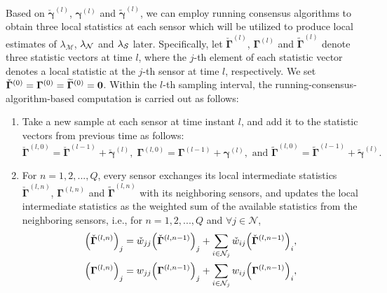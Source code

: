 \documentclass[11pt, draftclsnofoot, onecolumn]{IEEEtran}
\newcommand{\cM}{\mathcal{M}}
\newcommand{\cN}{\mathcal{N}}
\newcommand{\bgamma}{{\boldsymbol{\gamma}}}
\newcommand{\cbgamma}{{\check{\boldsymbol{\gamma}}}}
\newcommand{\tbgamma}{{\widetilde{\boldsymbol{\gamma}}}}
\newcommand{\bGamma}{{\boldsymbol{\Gamma}}}
\newcommand{\cbGamma}{{\check{\boldsymbol{\Gamma}}}}
\newcommand{\tbGamma}{{\widetilde{\boldsymbol{\Gamma}}}}
\newcommand{\cw}{{\check{w}}}
\begin{document}
Based on $\cbgamma^{(l)}$, $\bgamma^{(l)}$ and $\tbgamma^{(l)}$,  we can employ running consensus algorithms to obtain   three   local statistics at each sensor which will be utilized to produce local estimates of ${\lambda _\cM}$, ${\lambda _{\cal N}} $ and ${\lambda _{\cal S}}$ later. Specifically, let ${\cbGamma ^{\left( l \right)}}$, ${\bGamma ^{\left( l \right)}}$ and ${\tbGamma ^{\left( l \right)}}$ denote three statistic vectors at time $l$, where the $j$-th element of each statistic vector denotes a local statistic at the $j$-th sensor at time $l$, respectively. We set ${\cbGamma ^{\left( 0 \right)}} = {\bGamma ^{\left( 0 \right)}} = {\tbGamma ^{\left( 0 \right)}} ={\bf 0}$. Within the $l$-th sampling interval, the running-consensus-algorithm-based computation is carried out as follows:
\begin{enumerate}[1)]
	\item Take a new sample at each sensor at time instant $l$, and add it to the statistic vectors from previous time as follows:
	\begin{equation} \label{consensus_sample}
	{\cbGamma ^{\left( {l,0} \right)}} = {\cbGamma ^{\left( {l - 1} \right)}} + {\cbgamma ^{(l)}}, \; {\bGamma ^{\left( {l,0} \right)}} = {\bGamma ^{\left( {l - 1} \right)}} + {\bgamma ^{(l)}},   \text{ and } {\tbGamma ^{\left( {l,0} \right)}} = {\tbGamma ^{\left( {l - 1} \right)}} + {\tbgamma ^{(l)}}.
	\end{equation}
	\item For $n=1,2,...,Q$, every sensor exchanges its local intermediate statistics ${\cbGamma ^{\left( {l,n} \right)}}$, ${\bGamma ^{\left( {l,n} \right)}}$ and ${\tbGamma ^{\left( {l,n} \right)}}$ with its neighboring sensors, and updates the local intermediate statistics as the weighted sum of the available statistics from the neighboring sensors, i.e., for $n=1,2,...,Q$ and $\forall j \in \cN$, 
	\begin{align} \label{message_exchange_check}
	{\left( {{\cbGamma ^{\left( {l,n} \right)}}} \right)_j} & = {\cw_{jj}}{\left( {{\cbGamma ^{\left( {l,n - 1} \right)}}} \right)_j} + \sum\limits_{i \in {{\cal N}_j}} {{\cw_{ij}}{{\left( {{\cbGamma ^{\left( {l,n - 1} \right)}}} \right)}_i}}, \\ \label{message_exchange}
	{\left( {{\bGamma ^{\left( {l,n} \right)}}} \right)_j} & = {w_{jj}}{\left( {{\bGamma ^{\left( {l,n - 1} \right)}}} \right)_j} + \sum\limits_{i \in {{\cal N}_j}} {{w_{ij}}{{\left( {{\bGamma ^{\left( {l,n - 1} \right)}}} \right)}_i}}, \\ \label{message_exchange_tilde}

\end{align}
\end{enumerate}
\end{document}
